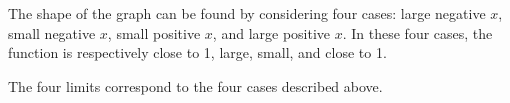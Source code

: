 The shape of the graph can be found by considering four cases:
 large negative $x$, small negative $x$, small positive $x$, and large positive $x$.
In these four cases, the function is respectively close to 1, large, small, and close to 1.


The four limits correspond to the four cases described above.
